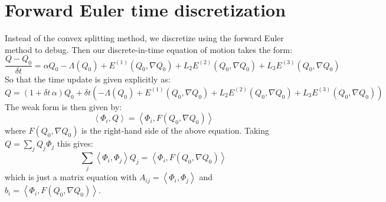 \documentclass[reqno]{article}
\begin{document}
\section{Forward Euler time discretization}
Instead of the convex splitting method, we discretize using the forward Euler method to debug.
Then our discrete-in-time equation of motion takes the form:
\begin{equation}
    \frac{Q - Q_0}{\delta t}
    =
    \alpha Q_0
    - \Lambda(Q_0)
    + E^{(1)} (Q_0, \nabla Q_0)
    + L_2 E^{(2)} (Q_0, \nabla Q_0)
    + L_3 E^{(3)} (Q_0, \nabla Q_0)
\end{equation}
So that the time update is given explicitly as:
\begin{equation}
    Q
    =
    \left( 1 + \delta t \, \alpha \right) Q_0
    + \delta t \left(
        -\Lambda(Q_0)
        + E^{(1)} (Q_0, \nabla Q_0)
        + L_2 E^{(2)} (Q_0, \nabla Q_0)
        + L_3 E^{(3)} (Q_0, \nabla Q_0)
    \right)
\end{equation}
The weak form is then given by:
\begin{equation}
    \left< \Phi_i, Q \right>
    =
    \left< \Phi_i, F(Q_0, \nabla Q_0) \right>
\end{equation}
where $F(Q_0, \nabla Q_0)$ is the right-hand side of the above equation.
Taking $Q = \sum_j Q_j \Phi_j$ this gives:
\begin{equation}
    \sum_j \left< \Phi_i, \Phi_j \right> Q_j
    =
    \left< \Phi_i, F(Q_0, \nabla Q_0) \right>
\end{equation}
which is just a matrix equation with $A_{ij} = \left< \Phi_i, \Phi_j \right>$ and $b_i = \left< \Phi_i, F(Q_0, \nabla Q_0) \right>$.
\end{document}
